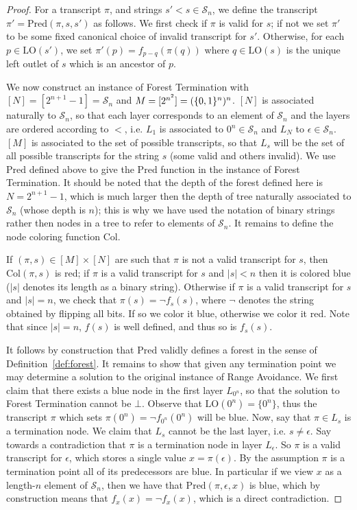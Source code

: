 \begin{proof}
For a transcript $\pi$, and strings $s' < s \in \mathcal{S}_n$, we define the transcript $\pi' = \mathrm{Pred}(\pi, s, s')$ as follows. We first check if $\pi$ is valid for $s$; if not we set $\pi'$ to be some fixed canonical choice of invalid transcript for $s'$. Otherwise, for each $p \in \mathrm{LO}(s')$, we set $\pi'(p) = f_{p-q}(\pi(q))$ where $q \in \mathrm{LO}(s)$ is the unique left outlet of $s$ which is an ancestor of $p$. 

We now construct an instance of {\sc Forest Termination} with $[N] = [2^{n+1}-1] = \mathcal{S}_n$ and $M = [2^{n^2}] = (\{0,1\}^n)^n$. $[N]$ is associated naturally to $\mathcal{S}_n$, so that each layer corresponds to an element of $\mathcal{S}_n$ and the layers are ordered according to $<$, i.e. $L_1$ is associated to $0^n \in \mathcal{S}_n$ and $L_N$ to $\epsilon \in \mathcal{S}_n$. $[M]$ is associated to the set of possible transcripts, so that $L_s$ will be the set of all possible transcripts for the string $s$ (some valid and others invalid). We use $\mathrm{Pred}$ defined above to give the $\mathrm{Pred}$ function in the instance of {\sc Forest Termination}. It should be noted that the depth of the forest defined here is $N = 2^{n+1}-1$, which is much larger then the depth of tree naturally associated to $\mathcal{S}_n$ (whose depth is $n$); this is why we have used the notation of binary strings rather then nodes in a tree to refer to elements of $\mathcal{S}_n$. It remains to define the node coloring function $\mathrm{Col}$.

If $(\pi,s) \in [M] \times [N]$ are such that $\pi$ is not a valid transcript for $s$, then $\mathrm{Col}(\pi,s)$ is red; if $\pi$ is a valid transcript for $s$ and $|s| < n$ then it is colored blue ($|s|$ denotes its length as a binary string). Otherwise if $\pi$ is a valid transcript for $s$ and $|s|=n$, we check that $\pi(s)= \lnot f_s(s)$, where $\lnot$ denotes the string obtained by flipping all bits. If so we color it blue, otherwise we color it red. Note that since $|s|=n$, $f(s)$ is well defined, and thus so is $f_s(s)$.

It follows by construction that $\mathrm{Pred}$ validly defines a forest in the sense of Definition~\ref{def:forest}. It remains to show that given any termination point we may determine a solution to the original instance of Range Avoidance. We first claim that there exists a blue node in the first layer $L_{0^n}$, so that the solution to {\sc Forest Termination} cannot be $\bot$. Observe that $\mathrm{LO}(0^n) = \{0^n\}$, thus the transcript $\pi$ which sets $\pi(0^n) = \lnot f_{0^n}(0^n)$ will be blue. Now, say that $\pi \in L_s$ is a termination node. We claim that $L_s$ cannot be the last layer, i.e. $s \neq \epsilon$. Say towards a contradiction that $\pi$ is a termination node in layer $L_{\epsilon}$. So $\pi$ is a valid transcript for $\epsilon$, which stores a single value $x = \pi(\epsilon)$. By the assumption $\pi$ is a termination point all of its predecessors are blue. In particular if we view $x$ as a length-$n$ element of $\mathcal{S}_n$, then we have that $\mathrm{Pred}(\pi,\epsilon, x)$ is blue, which by construction means that $f_{x}(x) = \lnot f_{x}(x)$, which is a direct contradiction.


\end{proof}

